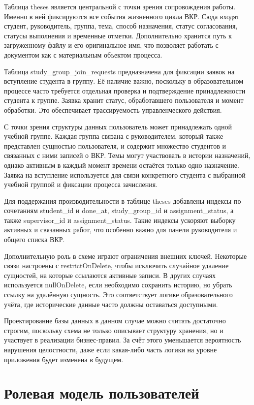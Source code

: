 \documentclass[14pt,a4paper]{extreport}
\begin{document}
Таблица theses является центральной с точки зрения сопровождения работы.
Именно в ней фиксируются все события жизненного цикла ВКР.
Сюда входят студент, руководитель, группа, тема, способ назначения, статус
согласования, статусы выполнения и временные отметки.
Дополнительно хранится путь к загруженному файлу и его оригинальное имя,
что позволяет работать с документом как с материальным объектом процесса.

Таблица study\_group\_join\_requests предназначена для фиксации заявок на
вступление студента в группу.
Её наличие важно, поскольку в образовательном процессе часто требуется
отдельная проверка и подтверждение принадлежности студента к группе.
Заявка хранит статус, обработавшего пользователя и момент обработки.
Это обеспечивает трассируемость управленческого действия.

С точки зрения структуры данных пользователь может принадлежать одной
учебной группе. Каждая группа связана с руководителем, который также
представлен сущностью пользователя, и содержит множество студентов и связанных
с ними записей о ВКР. Темы могут участвовать в истории назначений, однако
активным в каждый момент времени остаётся только одно назначение. Заявка на
вступление используется для связи конкретного студента с выбранной учебной
группой и фиксации процесса зачисления.

Для поддержания производительности в таблице theses добавлены индексы по
сочетаниям student\_id и done\_at, study\_group\_id и assignment\_status,
а также supervisor\_id и assignment\_status.
Такие индексы ускоряют выборку активных и связанных работ, что особенно
важно для панели руководителя и общего списка ВКР.

Дополнительную роль в схеме играют ограничения внешних ключей.
Некоторые связи настроены с restrictOnDelete, чтобы исключить случайное
удаление сущностей, на которые ссылаются активные записи.
В других случаях используется nullOnDelete, если необходимо сохранить
историю, но убрать ссылку на удалённую сущность.
Это соответствует логике образовательного учёта, где исторические данные
часто должны оставаться доступными.

Проектирование базы данных в данном случае можно считать достаточно строгим,
поскольку схема не только описывает структуру хранения, но и участвует в
реализации бизнес-правил.
За счёт этого уменьшается вероятность нарушения целостности, даже если
какая-либо часть логики на уровне приложения будет изменена в будущем.

\section{Ролевая модель пользователей}
\end{document}
